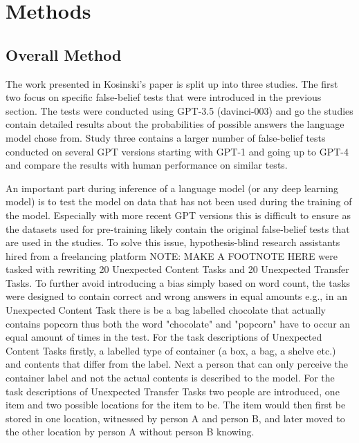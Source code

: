 \section{Methods}
\subsection{Overall Method}
The work presented in Kosinski's paper is split up into three studies. The first two focus on specific false-belief tests that were introduced in the previous section. The tests were conducted using GPT-3.5 (davinci-003) and go the studies contain detailed results about the probabilities of possible answers the language model chose from. Study three contains a larger number of false-belief tests conducted on several GPT versions starting with GPT-1 and going up to GPT-4 and compare the results with human performance on similar tests.

An important part during inference of a language model (or any deep learning model) is to test the model on data that has not been used during the training of the model. Especially with more recent GPT versions this is difficult to ensure as the datasets used for pre-training likely contain the original false-belief tests that are used in the studies. To solve this issue, hypothesis-blind research assistants hired from a freelancing platform NOTE: MAKE A FOOTNOTE HERE were tasked with rewriting 20 Unexpected Content Tasks and 20 Unexpected Transfer Tasks. To further avoid introducing a bias simply based on word count, the tasks were designed to contain correct and wrong answers in equal amounts e.g., in an Unexpected Content Task there is be a bag labelled chocolate that actually contains popcorn thus both the word "chocolate" and "popcorn" have to occur an equal amount of times in the test. For the task descriptions of Unexpected Content Tasks firstly, a labelled type of container (a box, a bag, a shelve etc.) and contents that differ from the label. Next a person that can only perceive the container label and not the actual contents is described to the model. For the task descriptions of Unexpected Transfer Tasks two people are introduced, one item and two possible locations for the item to be. The item would then first be stored in one location, witnessed by person A and person B, and later moved to the other location by person A without person B knowing.

